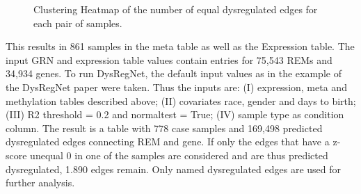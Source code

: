 \documentclass[pdftex,12pt,a4paper]{report}
\begin{document}
\begin{figure}[!ht]
\begin{center}
	\caption{Clustering Heatmap of the number of equal dysregulated edges for each pair of samples.}
	\label{brca_clustmap}
\end{center}
\end{figure} 
This results in 861 samples in the meta table as well as the Expression table. The input GRN and expression table values contain entries for 75,543 REMs and 34,934 genes.
To run DysRegNet, the default input values as in the example of the DysRegNet paper\cite{dysregnet} were taken. Thus the inputs are: (I) expression, meta and methylation tables described above; (II) covariates race, gender and days to birth; (III) R2 threshold = 0.2 and normaltest = True; (IV) sample type as condition column.
The result is a table with 778 case samples and 169,498 predicted dysregulated edges connecting REM and gene. If only the edges that have a z-score unequal 0 in one of the samples are considered and are thus predicted dysregulated, 1.890 edges remain. Only named dysregulated edges are used for further analysis. 
\end{document}
